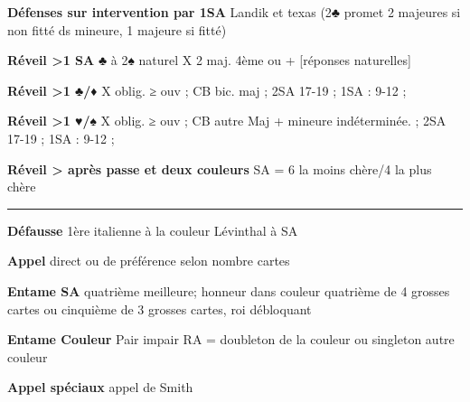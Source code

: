 \documentclass[twoside,a5paper]{article} \listfiles
\newcommand{\g}[1]{\textbf{#1}}
\begin{document}
{\begin{multicols}{2}
	 		
	 
	 \g{Défenses sur intervention par 1SA}  \newline
	Landik et texas (2♣ promet 2 majeures si non fitté ds mineure, 1 majeure si fitté) \newline
	   			
		 \vfill\columnbreak%

 	\g{Réveil >1 SA} ♣ à 2♠ naturel \newline
	X 2 maj. 4ème ou + [réponses naturelles]
	 
	 
	 \g{Réveil >1 ♣/♦} \newline
	 X oblig. ≥ ouv  ; CB bic. maj ; 2SA 17-19 ; 1SA : 9-12   ; 
	 
	 

	  \g{Réveil >1 ♥/♠} \newline
	 X oblig. ≥ ouv  ; CB autre Maj + mineure indéterminée. ; 2SA 17-19 ; 1SA : 9-12   ; 


	\g{Réveil > après passe et deux couleurs} SA = 6 la moins chère/4	 la plus chère
	 
	 \rule{\linewidth}{1.5pt}
	 		 
	  \g{Défausse} \newline
	  1ère italienne à la couleur \newline
	  Lévinthal à SA
	  
	  
	  \g{Appel} \newline
	 direct ou de préférence selon nombre cartes
	 
	   						 
	 
	 
	 \g{Entame SA} \newline
	quatrième meilleure; honneur dans couleur quatrième de 4 grosses cartes ou cinquième de 3 grosses cartes, roi débloquant


	\g{Entame Couleur} \newline
	Pair impair\newline
	RA = doubleton de la couleur ou singleton autre couleur


	\g{Appel spéciaux} \newline
	appel de Smith

	
	\end{multicols}
}
\end{document}
